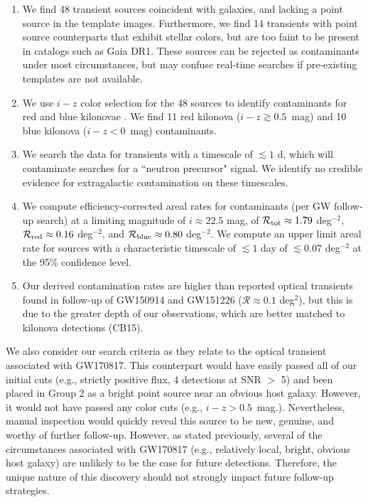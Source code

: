 \begin{enumerate}
\item We find 48 transient sources coincident with galaxies, and lacking a point source in the template images.  Furthermore, we find 14 transients with point source counterparts that exhibit stellar colors, but are too faint to be present in catalogs such as Gaia DR1.  These sources can be rejected as contaminants under most circumstances, but may confuse real-time searches if pre-existing templates are not available.

\item We use $i-z$ color selection for the 48 sources to identify contaminants for red and blue kilonovae \citep{BarnesKasen13,Kasen+15}. We find 11 red kilonova ($i-z \gtrsim 0.5$~mag) and 10 blue kilonova ($i-z < 0$~mag) contaminants.

\item We search the data for transients with a timescale of $\lesssim 1$ d, which will contaminate searches for a ``neutron precursor" signal.  We identify no credible evidence for extragalactic contamination on these timescales.

\item We compute efficiency-corrected areal rates for contaminants (per GW follow-up search) at a limiting magnitude of $i\approx 22.5$ mag, of $\mathcal{R}_{\rm tot}\approx 1.79$ deg$^{-2}$, $\mathcal{R}_{\rm red}\approx 0.16$ deg$^{-2}$, and $\mathcal{R}_{\rm blue}\approx 0.80$ deg$^{-2}$. We compute an upper limit areal rate for sources with a characteristic timescale of $\lesssim 1$ day of $\lesssim 0.07$ deg$^{-2}$ at the 95\% confidence level.

\item Our derived contamination rates are higher than reported optical transients found in follow-up of GW150914 and GW151226 ($\mathcal{R} \approx 0.1$ deg$^2$), but this is due to the greater depth of our observations, which are better matched to kilonova detections (CB15).
\end{enumerate}

We also consider our search criteria as they relate to the optical transient associated with GW170817. This counterpart would have easily passed all of our initial cuts (e.g., strictly positive flux, 4 detections at SNR $>$ 5) and been placed in Group 2 as a bright point source near an obvious host galaxy. However, it would not have passed any color cuts (e.g., $i-z > 0.5$~mag.). Nevertheless, manual inspection would quickly reveal this source to be new, genuine, and worthy of further follow-up. However, as stated previously, several of the circumstances associated with GW170817 (e.g., relatively local, bright, obvious host galaxy) are unlikely to be the case for future detections. Therefore, the unique nature of this discovery should not strongly impact future follow-up strategies.

